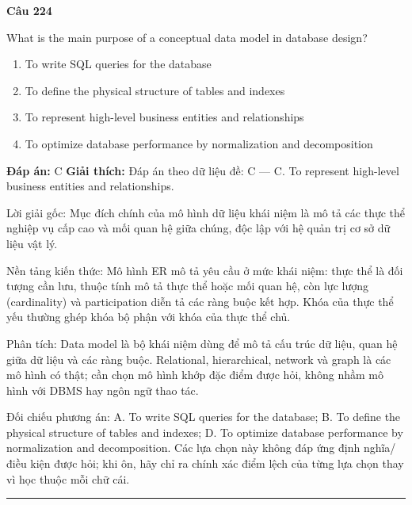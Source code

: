 \documentclass[11pt,a4paper]{article}
\newenvironment{question}[1]{%
  \par\vspace{1em}\noindent\textbf{\large Câu #1}\par\vspace{0.4em}
}{%
  \par\vspace{1em}\hrule\vspace{0.6em}
}
\newenvironment{choices}{%
  \begin{enumerate}[label=\textbf{\Alph*.},leftmargin=2.2em,itemsep=2pt,topsep=3pt]
}{%
  \end{enumerate}
}
\newcommand{\choice}{\item}
\begin{document}
\begin{question}{224}
What is the main purpose of a conceptual data model in database design?
\begin{choices}
\choice To write SQL queries for the database
\choice To define the physical structure of tables and indexes
\choice To represent high-level business entities and relationships
\choice To optimize database performance by normalization and decomposition
\end{choices}
\textbf{Đáp án:} C
\textbf{Giải thích:} Đáp án theo dữ liệu đề: C — C. To represent high-level business entities and relationships.

Lời giải gốc: Mục đích chính của mô hình dữ liệu khái niệm là mô tả các thực thể nghiệp vụ cấp cao và mối quan hệ giữa chúng, độc lập với hệ quản trị cơ sở dữ liệu vật lý.

Nền tảng kiến thức: Mô hình ER mô tả yêu cầu ở mức khái niệm: thực thể là đối tượng cần lưu, thuộc tính mô tả thực thể hoặc mối quan hệ, còn lực lượng (cardinality) và participation diễn tả các ràng buộc kết hợp. Khóa của thực thể yếu thường ghép khóa bộ phận với khóa của thực thể chủ.

Phân tích: Data model là bộ khái niệm dùng để mô tả cấu trúc dữ liệu, quan hệ giữa dữ liệu và các ràng buộc. Relational, hierarchical, network và graph là các mô hình có thật; cần chọn mô hình khớp đặc điểm được hỏi, không nhầm mô hình với DBMS hay ngôn ngữ thao tác.

Đối chiếu phương án: A. To write SQL queries for the database; B. To define the physical structure of tables and indexes; D. To optimize database performance by normalization and decomposition. Các lựa chọn này không đáp ứng định nghĩa/điều kiện được hỏi; khi ôn, hãy chỉ ra chính xác điểm lệch của từng lựa chọn thay vì học thuộc mỗi chữ cái.
\end{question}
\end{document}
